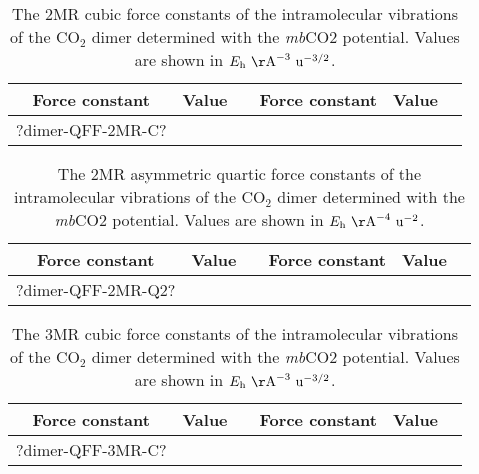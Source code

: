 \documentclass[aip,jcp,showpacs,superscriptaddress,groupedaddress]{revtex4-1}  %
\begin{document}
\begin{table}[H]
\centering
\caption{The 2MR cubic force constants of the intramolecular vibrations of the CO$_2$ dimer determined with the \emph{mb}CO2 potential. Values are shown in $E_{\rm h}\ {\rm \AA}^{-3}\ {\rm u}^{-3/2}$.}
\label{table:qff_dimer-2mr-t}
\begin{ruledtabular}
\begin{tabular}{cccccc}
Force constant & Value      &  & Force constant & Value      &    \\
\hline \Tstrut
?dimer-QFF-2MR-C?
\end{tabular}
\end{ruledtabular}
\end{table}

\begin{table}[H]
\centering
\caption{The 2MR asymmetric quartic force constants of the intramolecular vibrations of the CO$_2$ dimer determined with the \emph{mb}CO2 potential. Values are shown in $E_{\rm h}\ {\rm \AA}^{-4}\ {\rm u}^{-2}$.}
\label{table:qff_dimer-2mr-q2}
\begin{ruledtabular}
\begin{tabular}{cccccc}
Force constant & Value      &  & Force constant & Value      &    \\
\hline \Tstrut
?dimer-QFF-2MR-Q2?
\end{tabular}
\end{ruledtabular}
\end{table}

\begin{table}[H]
\centering
\caption{The 3MR cubic force constants of the intramolecular vibrations of the CO$_2$ dimer determined with the \emph{mb}CO2 potential. Values are shown in $E_{\rm h}\ {\rm \AA}^{-3}\ {\rm u}^{-3/2}$.}
\label{table:qff_dimer-3mr-c}
\begin{ruledtabular}
\begin{tabular}{cccccc}
Force constant & Value      &  & Force constant & Value      &    \\
\hline \Tstrut
?dimer-QFF-3MR-C?
\end{tabular}
\end{ruledtabular}
\end{table}
\end{document}
